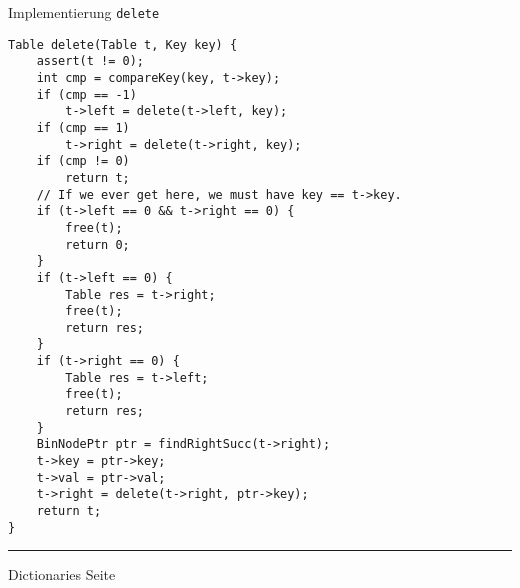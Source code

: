 
\begin{slide}{}
\normalsize

\begin{center}
Implementierung \texttt{delete}
\end{center}
\vspace*{0.5cm}

\footnotesize

\begin{verbatim}
Table delete(Table t, Key key) {
    assert(t != 0);
    int cmp = compareKey(key, t->key);
    if (cmp == -1)
        t->left = delete(t->left, key);
    if (cmp == 1)
        t->right = delete(t->right, key);
    if (cmp != 0)
        return t;
    // If we ever get here, we must have key == t->key.
    if (t->left == 0 && t->right == 0) {
        free(t);
        return 0;
    }
    if (t->left == 0) {
        Table res = t->right;
        free(t);
        return res;
    }
    if (t->right == 0) {
        Table res = t->left;
        free(t);
        return res;
    }
    BinNodePtr ptr = findRightSucc(t->right);
    t->key = ptr->key;
    t->val = ptr->val;
    t->right = delete(t->right, ptr->key);
    return t;   
}
\end{verbatim}

\vspace*{\fill}
\tiny \addtocounter{mypage}{1}
\rule{17cm}{1mm}
Dictionaries  \hspace*{\fill} Seite 
\end{slide}



